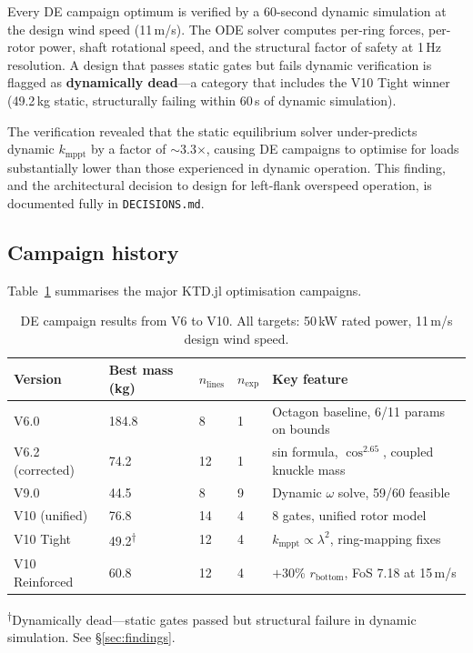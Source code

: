 \documentclass[11pt,a4paper]{article}
\begin{document}
Every DE campaign optimum is verified by a 60-second dynamic simulation at the design wind speed (11\,m/s).
The ODE solver computes per-ring forces, per-rotor power, shaft rotational speed, and the structural factor of safety at 1\,Hz resolution.
A design that passes static gates but fails dynamic verification is flagged as \textbf{dynamically dead}---a category that includes the V10 Tight winner (49.2\,kg static, structurally failing within 60\,s of dynamic simulation).

The verification revealed that the static equilibrium solver under-predicts dynamic $k_{\text{mppt}}$ by a factor of $\sim$3.3$\times$, causing DE campaigns to optimise for loads substantially lower than those experienced in dynamic operation.
This finding, and the architectural decision to design for left-flank overspeed operation, is documented fully in \texttt{DECISIONS.md}.

\subsection{Campaign history}

Table~\ref{tab:campaigns} summarises the major KTD.jl optimisation campaigns.

\begin{table}[htbp]
\centering
\caption{DE campaign results from V6 to V10. All targets: 50\,kW rated power, 11\,m/s design wind speed.}
\label{tab:campaigns}
\begin{tabular}{@{}lllll@{}}
\toprule
Version & Best mass (kg) & $n_{\text{lines}}$ & $n_{\text{exp}}$ & Key feature \\
\midrule
V6.0 & 184.8 & 8 & 1 & Octagon baseline, 6/11 params on bounds \\
V6.2 (corrected) & 74.2 & 12 & 1 & sin formula, $\cos^{2.65}$, coupled knuckle mass \\
V9.0 & 44.5 & 8 & 9 & Dynamic $\omega$ solve, 59/60 feasible \\
V10 (unified) & 76.8 & 14 & 4 & 8 gates, unified rotor model \\
V10 Tight & 49.2\textsuperscript{$\dagger$} & 12 & 4 & $k_{\text{mppt}} \propto \lambda^2$, ring-mapping fixes \\
V10 Reinforced & 60.8 & 12 & 4 & $+$30\% $r_{\text{bottom}}$, FoS 7.18 at 15\,m/s \\
\bottomrule
\end{tabular}

\vspace{6pt}
\footnotesize\textsuperscript{$\dagger$}Dynamically dead---static gates passed but structural failure in dynamic simulation. See \S\ref{sec:findings}.
\end{table}
\end{document}
